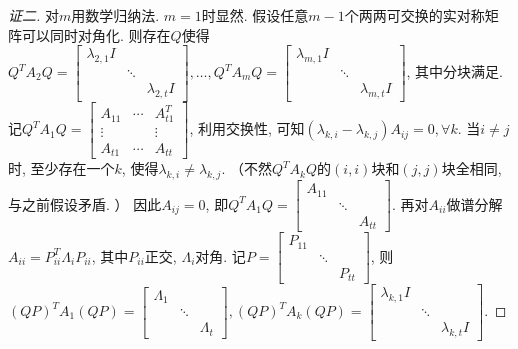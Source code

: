 \documentclass{ctexart}
\begin{document}
\begin{proof}[证二]
	对$m$用数学归纳法. $m=1$时显然. 
	假设任意$m-1$个两两可交换的实对称矩阵可以同时对角化. 则存在$Q$使得$Q^TA_2Q=\begin{bmatrix}
		\lambda_{2,1}I \\ & \ddots\\ && \lambda_{2,t}I
	\end{bmatrix},\dots,Q^TA_mQ=\begin{bmatrix}
		\lambda_{m,1}I \\ & \ddots\\ && \lambda_{m,t}I
	\end{bmatrix}$, 其中分块满足. 
	记$Q^TA_1Q=\begin{bmatrix}
		A_{11} & \cdots & A_{t1}^T\\
		\vdots && \vdots \\
		A_{t1} & \cdots & A_{tt}
	\end{bmatrix}$, 利用交换性, 可知$(\lambda_{k,i}-\lambda_{k,j})A_{ij}=0,\forall k$. 当$i\ne j$时, 至少存在一个$k$, 使得$\lambda_{k,i}\ne \lambda_{k,j}$. （不然$Q^TA_kQ$的$(i,i)$块和$(j,j)$块全相同, 与之前假设矛盾. ）
	因此$A_{ij}=0$, 即$Q^TA_1Q=\begin{bmatrix}
		A_{11} \\ & \ddots \\ &&A_{tt}
	\end{bmatrix}$. 再对$A_{ii}$做谱分解$A_{ii}=P_{ii}^T\Lambda_i P_{ii}$, 其中$P_{ii}$正交, $\Lambda_i$对角. 
	记$P=\begin{bmatrix}
		P_{11} \\ &\ddots \\ && P_{tt}
	\end{bmatrix}$, 则$(QP)^TA_1(QP)=\begin{bmatrix}
		\Lambda_1 \\ &\ddots \\ && \Lambda_t
	\end{bmatrix},(QP)^TA_k(QP)=\begin{bmatrix}
		\lambda_{k,1}I \\ & \ddots\\ && \lambda_{k,t}I
	\end{bmatrix}$. 
\end{proof}

\clearpage
\listofchanges
\end{document}
